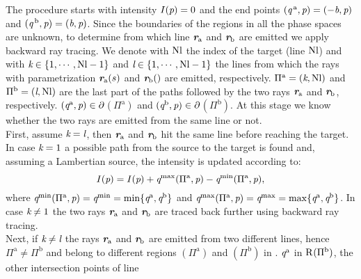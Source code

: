 The procedure starts with intensity $I(\textit{p})=0$ and the end points $(\textit{q}^{\,\textrm{a}}, \textit{p})= (-\textit{b}, \textit{p})$ and $(\textit{q}^{\,\textrm{b}}, \textit{p}) = (\textit{b}, \textit{p})$. Since the boundaries of the regions in all the phase spaces are unknown, to determine from which line $\textit{\textbf{r}}_{\textrm{a}}$ and $\textit{\textbf{r}}_{\textrm{b}}$ are emitted we apply backward ray tracing. We denote with $\textrm{Nl}$ the index of the target (line $\textrm{Nl}$) and with $\textit{k}\in\{1,\cdots, \textrm{Nl}-1\}$ and $\textit{l}\in\{1,\cdots, \textrm{Nl}-1\}$ the lines from which the rays with parametrization $\textit{\textbf{r}}_{\textrm{a}}(s)$ and $\textit{\textbf{r}}_{\textrm{b}}()$ are emitted, respectively. $\Pi^\textrm{a} = (\textit{k}, \textrm{Nl})$ and $\Pi^\textrm{b} = (\textit{l},\textrm{Nl})$ are the last part of the paths followed by the two rays $\textit{\textbf{r}}_{\textrm{a}}$ and $\textit{\textbf{r}}_{\textrm{b}}$, respectively. $(\textit{q}^{\textrm{a}}, \textit{p})\in\partial$$(\Pi^{\textrm{a}})$ and $(\textit{q}^{\textrm{b}}, \textit{p})\in\partial$$(\Pi^{\textrm{b}})$. At this stage we know whether the two rays are emitted from the same line or not. \\ \indent 
First, assume $\textit{k}= \textit{l}$, then $\textit{\textbf{r}}_{\textrm{a}}$ and $\textit{\textbf{r}}_{\textrm{b}}$ hit the same line before reaching the target. 
In case $\textit{k} = 1$ a possible path from the source to the target is found and, assuming a Lambertian source, the intensity is updated according to:
\begin{equation}
I(\textit{p}) = I(\textit{p})+\textit{q}^{\textrm{max}}(\Pi^\textrm{a}, \textit{p})-\textit{q}^{\textrm{min}}(\Pi^\textrm{a}, \textit{p}),
\end{equation}
where $\textit{q}^{\textrm{min}}(\Pi^\textrm{a}, \textit{p}) = \textit{q}^{\textrm{min}} = \min\{\textit{q}^{\textrm{a}}, \textit{q}^{\textrm{b}}\}$ and $\textit{q}^{\textrm{max}}(\Pi^\textrm{a}, \textit{p}) = \textit{q}^{\textrm{max}} = \max\{\textit{q}^{\textrm{a}}, \textit{q}^{\textrm{b}}\}$. In case $\textit{k}\neq 1$ the two rays $\textit{\textbf{r}}_{\textrm{a}}$ and $\textit{\textbf{r}}_{\textrm{b}}$ are traced back further using backward ray tracing.
\\ \indent Next, if $\textit{k}\neq \textit{l}$ the rays $\textit{\textbf{r}}_\textrm{a}$ and $\textit{\textbf{r}}_\textrm{b}$ are emitted from two different lines, hence $\Pi^{\textrm{a}}\neq \Pi^{\textrm{b}}$ and belong to different regions $(\Pi^{\textrm{a}})$ and $(\Pi^{\textrm{b}})$ in . $\textit{q}^{\textrm{a}}$ in $\mbox{$\textup{R}_{\textit{}}$}(\Pi^{\textrm{b}})$, the other intersection points of line 
